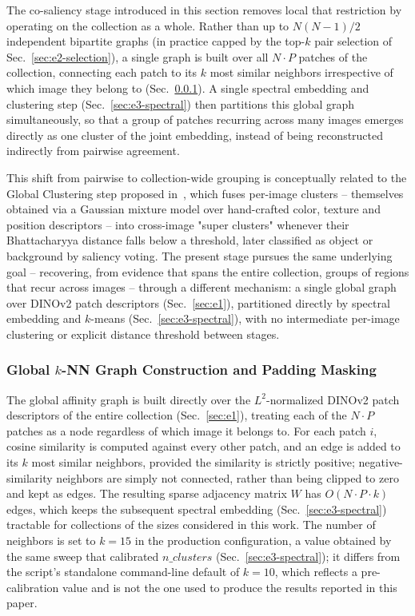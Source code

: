 The co-saliency stage introduced in this section removes local that restriction by operating on the collection as a whole. Rather than up to $N(N-1)/2$ independent bipartite graphs (in practice capped by the top-$k$ pair selection of Sec.~\ref{sec:e2-selection}), a single graph is built over all $N \cdot P$ patches of the collection, connecting each patch to its $k$ most similar neighbors irrespective of which image they belong to (Sec.~\ref{sec:e3-graph}). A single spectral embedding and clustering step (Sec.~\ref{sec:e3-spectral}) then partitions this global graph simultaneously, so that a group of patches recurring across many images emerges directly as one cluster of the joint embedding, instead of being reconstructed indirectly from pairwise agreement.

This shift from pairwise to collection-wide grouping is conceptually related to the Global Clustering step proposed in~\cite{lattari2015}, which fuses per-image clusters -- themselves obtained via a Gaussian mixture model over hand-crafted color, texture and position descriptors -- into cross-image "super clusters" whenever their Bhattacharyya distance falls below a threshold, later classified as object or background by saliency voting. The present stage pursues the same underlying goal -- recovering, from evidence that spans the entire collection, groups of regions that recur across images -- through a different mechanism: a single global graph over DINOv2 patch descriptors (Sec.~\ref{sec:e1}), partitioned directly by spectral embedding and $k$-means (Sec.~\ref{sec:e3-spectral}), with no intermediate per-image clustering or explicit distance threshold between stages.

\subsubsection{Global $k$-NN Graph Construction and Padding Masking}
\label{sec:e3-graph}

The global affinity graph is built directly over the $L^2$-normalized DINOv2 patch descriptors of the entire collection (Sec.~\ref{sec:e1}), treating each of the $N \cdot P$ patches as a node regardless of which image it belongs to. For each patch $i$, cosine similarity is computed against every other patch, and an edge is added to its $k$ most similar neighbors, provided the similarity is strictly positive; negative-similarity neighbors are simply not connected, rather than being clipped to zero and kept as edges. The resulting sparse adjacency matrix $W$ has $O(N \cdot P \cdot k)$ edges, which keeps the subsequent spectral embedding (Sec.~\ref{sec:e3-spectral}) tractable for collections of the sizes considered in this work. The number of neighbors is set to $k=15$ in the production configuration, a value obtained by the same sweep that calibrated $n\_clusters$ (Sec.~\ref{sec:e3-spectral}); it differs from the script's standalone command-line default of $k=10$, which reflects a pre-calibration value and is not the one used to produce the results reported in this paper.

